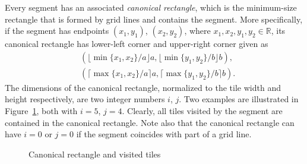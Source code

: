 \documentclass[12pt, a4paper]{article}
\newcommand{\touched}{visited}
\begin{document}
Every segment has an associated \emph{canonical rectangle}, which is the minimum-size rectangle that is formed by grid lines and contains the segment. More specifically, if the segment has endpoints $(x_1,y_1)$, $(x_2,y_2)$, where $x_1, x_2, y_1, y_2 \in \mathbb R$, its canonical rectangle has lower-left corner and upper-right corner given as
\begin{align*}
& (\lfloor\min\{x_1, x_2\}/a\rfloor a, \lfloor\min\{y_1,y_2\}/b\rfloor b), \\
& (\lceil\max\{x_1, x_2\}/a \rceil a, \lceil\max\{y_1,y_2\}/b \rceil b).
\end{align*}
The dimensions of the canonical rectangle, normalized to the tile width and height respectively, are two integer numbers $i$, $j$. Two examples are illustrated in Figure~\ref{fig: canonical rectangle and touched tiles}, both with $i=5$, $j=4$. Clearly, all tiles \touched{} by the segment are contained in the canonical rectangle. Note also that the canonical rectangle can have $i=0$ or $j=0$ if the segment coincides with part of a grid line.

\begin{figure}
\centering%
\hfill%
%
\caption{Canonical rectangle and \touched{} tiles
}%
\label{fig: canonical rectangle and touched tiles}%
\end{figure}%
\end{document}
